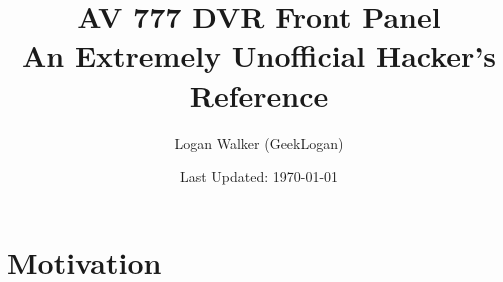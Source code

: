 \documentclass[]{article}
\begin{document}
\title{{\Huge AV 777 DVR Front Panel  } \\
	 {\Large An Extremely Unofficial Hacker's Reference}}
\author{{\large Logan Walker (GeekLogan)}}
\date{{\normalsize Last Updated: \today }}
\maketitle

\section{Motivation}
\end{document}
